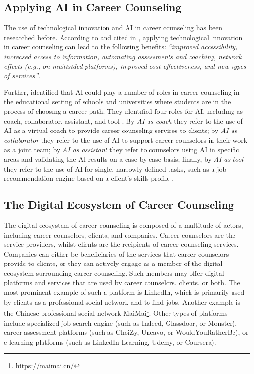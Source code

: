 \subsection{Applying AI in Career Counseling}

The use of technological innovation and AI in career counseling has been researched before. According to
\cite{westmanArtificialIntelligenceCareer2021} and cited in \cite{kaserAIpoweredCareerCounseling2023}, applying
technological innovation in career counseling can lead to the following benefits: \textit{``improved accessibility,
increased access to information, automating assessments and coaching, network effects (e.g., on multisided platforms),
improved cost-effectiveness, and new types of services''}.

Further, \cite{westmanArtificialIntelligenceCareer2021} identified that AI could play a number of roles in career
counseling in the educational setting of schools and universities where students are in the process of choosing a career
path. They identified four roles for AI, including as coach, collaborator, assistant, and tool \citep{westmanArtificialIntelligenceCareer2021}.
By \textit{AI as coach} they refer to the use of AI as a virtual coach to provide career counseling services to clients; by
\textit{AI as collaborator} they refer to the use of AI to support career counselors in their work as a joint team; by
\textit{AI as assistant} they refer to counselors using AI in specific areas and validating the AI results on a case-by-case
basis; finally, by \textit{AI as tool} they refer to the use of AI for single, narrowly defined tasks, such as a job recommendation
engine based on a client's skills profile \citep{westmanArtificialIntelligenceCareer2021}.

\subsection{The Digital Ecosystem of Career Counseling}

The digital ecosystem of career counseling is composed of a multitude of actors, including career counselors, clients,
and companies. Career counselors are the service providers, whilst clients are the recipients of career counseling services.
Companies can either be beneficiaries of the services that career counselors provide to clients, or they can actively engage
as a member of the digital ecosystem surrounding career counseling. Such members may offer digital platforms and services
that are used by career counselors, clients, or both. The most prominent example of such a platform is LinkedIn, which
is primarily used by clients as a professional social network and to find jobs. Another example is the Chinese professional
social network MaiMai\footnote[2]{\url{https://maimai.cn/}}. Other types of platforms include specialized job search engine
 (such as Indeed, Glassdoor, or Monster), career assessment platforms (such as ChoiZy, Uncavo, or WouldYouRatherBe), or
 e-learning platforms (such as LinkedIn Learning, Udemy, or Coursera).

